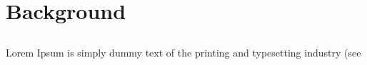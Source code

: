 
\chapter{Background}  %

\ifpdf
    \graphicspath{{Chapter1/Figs/Raster/}{Chapter1/Figs/PDF/}{Chapter1/Figs/}}
\else
    \graphicspath{{Chapter1/Figs/Vector/}{Chapter1/Figs/}}
\fi


\section{} %

Lorem Ipsum is simply dummy text of the printing and typesetting industry (see 

